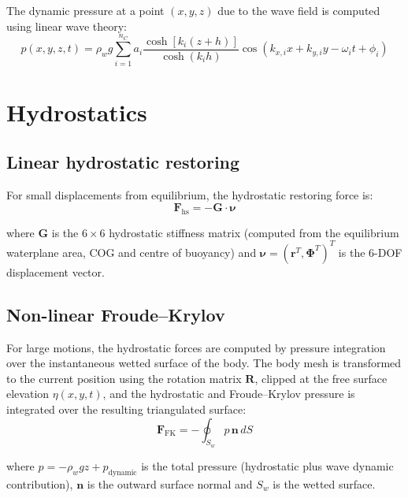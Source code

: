 \documentclass[11pt]{article}
\begin{document}
The dynamic pressure at a point $(x,y,z)$ due to the wave field is computed using linear wave theory:
\begin{equation}
p(x,y,z,t) = \rho_w g \sum_{i=1}^{n_C} a_i\frac{\cosh[k_i(z+h)]}{\cosh(k_i h)}\cos(k_{x,i}x + k_{y,i}y - \omega_i t + \phi_i)
\end{equation}


\section{Hydrostatics}
\label{sec:hydrostatics}

\subsection{Linear hydrostatic restoring}

For small displacements from equilibrium, the hydrostatic restoring force is:
\begin{equation}
\mathbf{F}_{\text{hs}} = -\mathbf{G}\cdot\boldsymbol{\nu}
\end{equation}

where $\mathbf{G}$ is the $6\times 6$ hydrostatic stiffness matrix (computed from the equilibrium waterplane area, COG and centre of buoyancy) and $\boldsymbol{\nu} = (\mathbf{r}^T, \boldsymbol{\Phi}^T)^T$ is the 6-DOF displacement vector.

\subsection{Non-linear Froude--Krylov}

For large motions, the hydrostatic forces are computed by pressure integration over the instantaneous wetted surface of the body. The body mesh is transformed to the current position using the rotation matrix $\mathbf{R}$, clipped at the free surface elevation $\eta(x,y,t)$, and the hydrostatic and Froude--Krylov pressure is integrated over the resulting triangulated surface:
\begin{equation}
\mathbf{F}_{\text{FK}} = -\oint_{S_w} p\,\mathbf{n}\,dS
\end{equation}

where $p = -\rho_w g z + p_{\text{dynamic}}$ is the total pressure (hydrostatic plus wave dynamic contribution), $\mathbf{n}$ is the outward surface normal and $S_w$ is the wetted surface.
\end{document}
